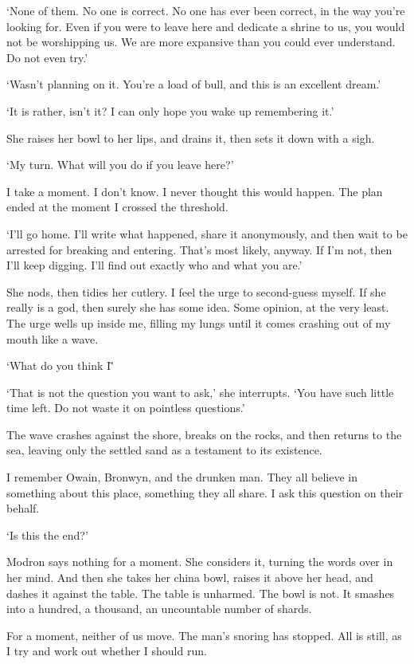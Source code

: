 `None of them. No one is correct. No one has ever been correct, in the
way you're looking for. Even if you were to leave here and dedicate a
shrine to us, you would not be worshipping us. We are more expansive
than you could ever understand. Do not even try.'

`Wasn't planning on it. You're a load of bull, and this is an
excellent dream.'

`It is rather, isn't it? I can only hope you wake up remembering it.'

She raises her bowl to her lips, and drains it, then sets it down with
a sigh.

`My turn. What will you do if you leave here?'

I take a moment. I don't know. I never thought this would happen. The
plan ended at the moment I crossed the threshold.

`I'll go home. I'll write what happened, share it anonymously, and
then wait to be arrested for breaking and entering. That's most
likely, anyway. If I'm not, then I'll keep digging. I'll find out
exactly who and what you are.'

She nods, then tidies her cutlery. I feel the urge to second-guess
myself. If she really is a god, then surely she has some idea. Some
opinion, at the very least. The urge wells up inside me, filling my
lungs until it comes crashing out of my mouth like a wave.

`What do you think I\='

`That is not the question you want to ask,' she interrupts. `You have
such little time left. Do not waste it on pointless questions.'

The wave crashes against the shore, breaks on the rocks, and then
returns to the sea, leaving only the settled sand as a testament to
its existence.

I remember Owain, Bronwyn, and the drunken man. They all believe in
something about this place, something they all share. I ask this
question on their behalf.

`Is this the end?'

Modron says nothing for a moment. She considers it, turning the words
over in her mind. And then she takes her china bowl, raises it above
her head, and dashes it against the table. The table is unharmed. The
bowl is not. It smashes into a hundred, a thousand, an uncountable
number of shards.

For a moment, neither of us move. The man's snoring has stopped. All
is still, as I try and work out whether I should run.

